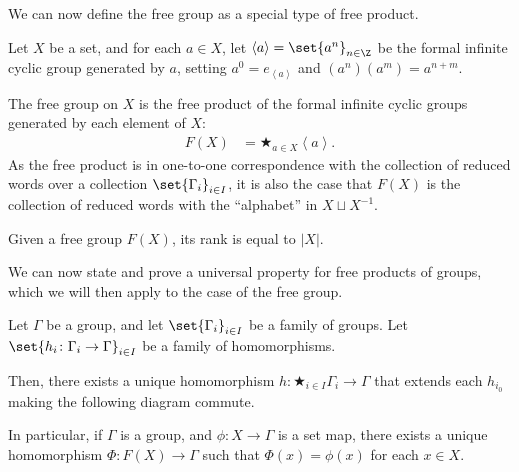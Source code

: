 We can now define the free group as a special type of free product.
\begin{definition}\label{def:free_group_as_product}
  Let $X$ be a set, and for each $a\in X$, let $\left\langle a \right\rangle = \set{a^n}_{n\in \Z}$ be the formal infinite cyclic group generated by $a$, setting $a^0 = e_{\left\langle a \right\rangle}$ and $\left(a^n\right) \left(a^m\right) = a^{n+m}$.\newline

  The free group on $X$ is the free product of the formal infinite cyclic groups generated by each element of $X$:
  \begin{align*}
    F(X) &= \bigstar_{a\in X}\left\langle a \right\rangle.
  \end{align*}
  As the free product is in one-to-one correspondence with the collection of reduced words over a collection $\set{\Gamma_i}_{i\in I}$, it is also the case that $F(X)$ is the collection of reduced words with the ``alphabet'' in $X\sqcup X^{-1}$.\newline

  Given a free group $F(X)$, its rank is equal to $\left\vert X \right\vert$.
\end{definition}
We can now state and prove a universal property for free products of groups, which we will then apply to the case of the free group.
\begin{theorem}
  Let $\Gamma$ be a group, and let $\set{\Gamma_{i}}_{i\in I}$ be a family of groups. Let $\set{h_i\colon \Gamma_i\rightarrow \Gamma}_{i\in I}$ be a family of homomorphisms.\newline

  Then, there exists a unique homomorphism $h\colon \bigstar_{i\in I}\Gamma_i \rightarrow \Gamma$ that extends each $h_{i_{0}}$ making the following diagram commute.
  \begin{center}
  \end{center}
  In particular, if $\Gamma$ is a group, and $\phi\colon X\rightarrow \Gamma$ is a set map, there exists a unique homomorphism $\Phi\colon F(X)\rightarrow \Gamma$ such that $\Phi(x) = \phi(x)$ for each $x\in X$.
\end{theorem}
